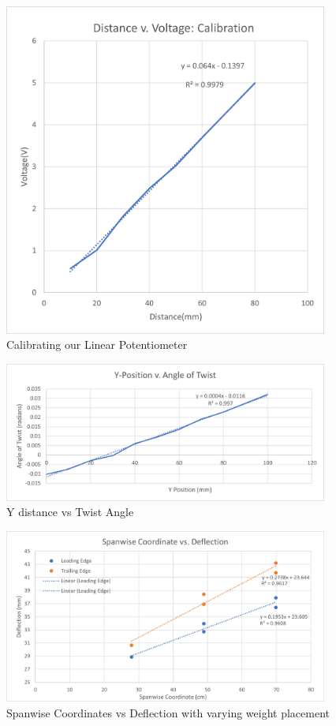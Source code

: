 \documentclass{article}
\begin{document}
\begin{figure}[hbtp]
  \centering
  \includegraphics[width=0.95\textwidth]{lab3images/Calibration.png}
  \caption{Calibrating our Linear Potentiometer}
  \label{fig:Calibration}
\end{figure}


\begin{figure}[hbtp]
  \centering
  \includegraphics[width=0.95\textwidth]{lab3images/YvsTwist.png}
  \caption{Y distance vs Twist Angle}
  \label{fig:YvsTwist}
\end{figure}


\begin{figure}[hbtp]
  \centering
  \includegraphics[width=0.95\textwidth]{lab3images/SpanwiseDeflection.png}
  \caption{Spanwise Coordinates vs Deflection with varying weight placement}
  \label{fig:SpanwiseDeflection}
\end{figure}
\end{document}
